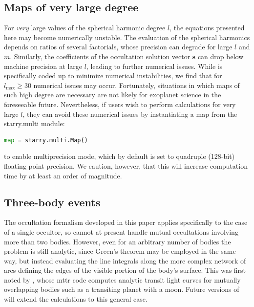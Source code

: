 \documentclass[modern]{aastex61}
\begin{document}
\subsection{Maps of very large degree}
For \emph{very} large values of the spherical harmonic degree $l$, the
equations presented here may become numerically unstable. The evaluation
of the spherical harmonics depends on ratios of several factorials, whose
precision can degrade for large $l$ and $m$. Similarly, the coefficients
of the occultation solution vector $\mathbf{s}$ can drop below machine
precision at large $l$, leading to further numerical issues. While
\starry is specifically coded up to minimize numerical instabilities,
we find that for $l_\mathrm{max} \geq 30$ numerical issues may occur.
Fortunately, situations in which maps of such high degree are necessary
are not likely for exoplanet science in the foreseeable future.
Nevertheless, if users wish to perform calculations for very large $l$,
they can avoid these numerical issues by instantiating a map from the \textsf{starry.multi}
module:
%
\begin{lstlisting}[language=Python,firstnumber=last]
map = starry.multi.Map()
\end{lstlisting}
%
to enable multiprecision mode, which by default is set to quadruple (128-bit)
floating point precision. We caution, however, that this will increase
computation time by at least an order of magnitude.

\subsection{Three-body events}
The occultation formalism developed in this paper applies specifically to the
case of a single occultor, so \starry cannot at present handle mutual occultations
involving more than two bodies. However, even for an arbitrary number of bodies
the problem is still analytic, since Green's theorem may be employed in the same
way, but instead evaluating the line integrals along the more complex network of
arcs defining the edges of the visible portion of the body's surface. This was
first noted by \cite{Pal2012}, whose \textsf{mttr} code computes analytic
transit light curves for mutually overlapping bodies such as a transiting
planet with a moon. Future versions of \starry will extend the calculations
to this general case.

\end{document}

